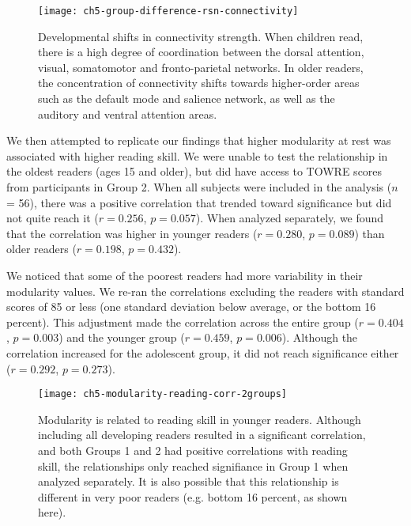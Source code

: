 \begin{figure}[t!]
	\centering
	\texttt{[image: ch5-group-difference-rsn-connectivity]}
    \caption[Developmental shifts in RSN interactivity]{Developmental shifts in connectivity strength. When children read, there is a high degree of coordination between the dorsal attention, visual, somatomotor and fronto-parietal networks. In older readers, the concentration of connectivity shifts towards higher-order areas such as the default mode and salience network, as well as the auditory and ventral attention areas.  }
	\label{fig:ch5-group-difference-rsn-connectivity}
\end{figure}

We then attempted to replicate our findings that higher modularity at rest was associated with higher reading skill. We were unable to test the relationship in the oldest readers (ages 15 and older), but did have access to TOWRE scores from participants in Group 2. When all subjects were included in the analysis ($n$ = 56), there was a positive correlation that trended toward significance but did not quite reach it ($r = 0.256$, $p = 0.057$). When analyzed separately, we found that the correlation was higher in younger readers ($r=0.280$, $p=0.089$) than older readers ($r=0.198$, $p=0.432$). 

We noticed that some of the poorest readers had more variability in their modularity values. We re-ran the correlations excluding the readers with standard scores of 85 or less (one standard deviation below average, or the bottom 16 percent). This adjustment made the correlation across the entire group ($r = 0.404$, $p = 0.003$) and the younger group ($r = 0.459$, $p = 0.006$). Although the correlation increased for the adolescent group, it did not reach significance either ($r = 0.292$, $p = 0.273$).

\begin{figure}[t]
	\centering
	\texttt{[image: ch5-modularity-reading-corr-2groups]}
    \caption[Modularity is related to reading skill in younger readers]{Modularity is related to reading skill in younger readers. Although including all developing readers resulted in a significant correlation, and both Groups 1 and 2 had positive correlations with reading skill, the relationships only reached signifiance in Group 1 when analyzed separately. It is also possible that this relationship is different in very poor readers (e.g. bottom 16 percent, as shown here).}
	\label{fig:ch5-modularity-reading-corr-2groups}
\end{figure}

